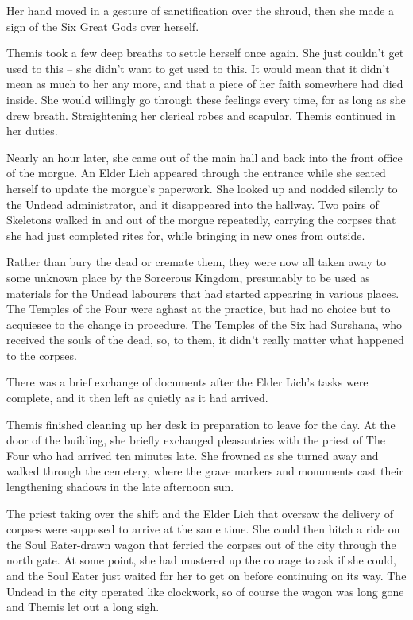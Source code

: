  

Her hand moved in a gesture of sanctification over the shroud, then she made a sign of the Six Great Gods over herself.

 

Themis took a few deep breaths to settle herself once again. She just couldn’t get used to this – she didn’t want to get used to this. It would mean that it didn’t mean as much to her any more, and that a piece of her faith somewhere had died inside. She would willingly go through these feelings every time, for as long as she drew breath. Straightening her clerical robes and scapular, Themis continued in her duties.

 

Nearly an hour later, she came out of the main hall and back into the front office of the morgue. An Elder Lich appeared through the entrance while she seated herself to update the morgue’s paperwork. She looked up and nodded silently to the Undead administrator, and it disappeared into the hallway. Two pairs of Skeletons walked in and out of the morgue repeatedly, carrying the corpses that she had just completed rites for, while bringing in new ones from outside.

 

Rather than bury the dead or cremate them, they were now all taken away to some unknown place by the Sorcerous Kingdom, presumably to be used as materials for the Undead labourers that had started appearing in various places. The Temples of the Four were aghast at the practice, but had no choice but to acquiesce to the change in procedure. The Temples of the Six had Surshana, who received the souls of the dead, so, to them, it didn’t really matter what happened to the corpses.

 

There was a brief exchange of documents after the Elder Lich’s tasks were complete, and it then left as quietly as it had arrived.

 

Themis finished cleaning up her desk in preparation to leave for the day. At the door of the building, she briefly exchanged pleasantries with the priest of The Four who had arrived ten minutes late. She frowned as she turned away and walked through the cemetery, where the grave markers and monuments cast their lengthening shadows in the late afternoon sun.

 

The priest taking over the shift and the Elder Lich that oversaw the delivery of corpses were supposed to arrive at the same time. She could then hitch a ride on the Soul Eater-drawn wagon that ferried the corpses out of the city through the north gate. At some point, she had mustered up the courage to ask if she could, and the Soul Eater just waited for her to get on before continuing on its way. The Undead in the city operated like clockwork, so of course the wagon was long gone and Themis let out a long sigh.

